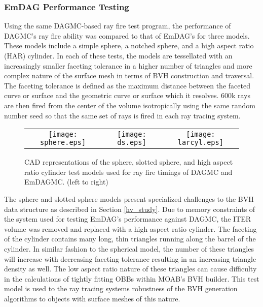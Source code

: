\subsubsection{EmDAG Performance Testing}%

Using the same DAGMC-based ray fire test program, the performance of DAGMC's ray
fire ability was compared to that of EmDAG's for three models. These models
include a simple sphere, a notched sphere, and a high aspect ratio (HAR)
cylinder. In each of these tests, the models are tessellated with an
increasingly smaller faceting tolerance in a higher number of triangles and more
complex nature of the surface mesh in terms of BVH construction and
traversal. The faceting tolerance is defined as the maximum distance between the
faceted curve or surface and the geometric curve or surface which it
resolves. 600k rays are then fired from the center of the volume isotropically
using the same random number seed so that the same set of rays is fired in each
ray tracing system.

\begin{figure}[H]
  \begin{center}
    \begin{tabular}{ccc}
      \texttt{[image: sphere.eps]} &
      \texttt{[image: ds.eps]} &
      \texttt{[image: larcyl.eps]} \\
    \end{tabular}
    \caption{CAD representations of the sphere, slotted sphere, and high aspect
      ratio cylinder test models used for ray fire timings of DAGMC and
      EmDAGMC. (left to right) \label{models}}
  \end{center}
\end{figure} 

The sphere and slotted sphere models present specialized challenges to the BVH
data structure as described in Section \ref{hv_study}. Due to memory constraints
of the system used for testing EmDAG's performance against DAGMC, the ITER
volume was removed and replaced with a high aspect ratio cylinder. The faceting
of the cylinder contains many long, thin triangles running along the barrel of
the cylinder. In similar fashion to the spherical model, the number of these
triangles will increase with decreasing faceting tolerance resulting in an
increasing triangle density as well. The low aspect ratio nature of these
triangles can cause difficulty in the calculations of tightly fitting OBBs
within MOAB's BVH builder. This test model is used to the ray tracing systems
robustness of the BVH generation algorithms to objects with surface meshes of
this nature.

